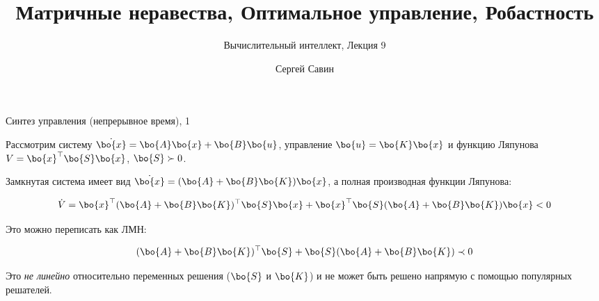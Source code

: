 \documentclass{beamer}
\title{Матричные неравества, Оптимальное управление, Робастность}
\subtitle{Вычислительный интеллект, Лекция 9}
\author{Сергей Савин}
\date{\mydate}
\begin{document}
\maketitle


%	
%	
%	




\begin{frame}{Синтез управления (непрерывное время), 1}
	\begin{flushleft}
		
		Рассмотрим систему $\dot{\bo{x}} = \bo{A}\bo{x} + \bo{B}\bo{u}$, управление $\bo{u} = \bo{K}\bo{x}$ и функцию Ляпунова $V = \bo{x}^\top\bo{S}\bo{x}$, $\bo{S} \succ 0$.
		
		\bigskip
		
		Замкнутая система имеет вид $\dot{\bo{x}} = (\bo{A} + \bo{B}\bo{K})\bo{x}$, а полная производная функции Ляпунова:
		
		\begin{equation}
			\dot V = \bo{x}^\top (\bo{A} + \bo{B}\bo{K})^\top\bo{S}\bo{x} + \bo{x}^\top\bo{S} (\bo{A} + \bo{B}\bo{K}) \bo{x} < 0
		\end{equation}
		
		Это можно переписать как ЛМН:
		
		\begin{equation}
			\label{eq:vdot}
			(\bo{A} + \bo{B}\bo{K})^\top\bo{S} + \bo{S} (\bo{A} + \bo{B}\bo{K}) \prec 0
		\end{equation}
		
		Это \emph{не линейно} относительно переменных решения ($\bo{S}$ и $\bo{K}$) и не может быть решено напрямую с помощью популярных решателей.
		
	\end{flushleft}
\end{frame}
\end{document}
